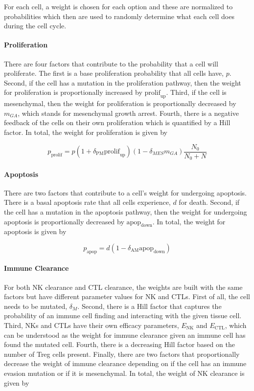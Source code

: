 \documentclass{article}
\begin{document}
For each cell, a weight is chosen for each option and these are normalized to probabilities which then are used to randomly determine what each cell does during the cell cycle.

\paragraph{Proliferation}
There are four factors that contribute to the probability that a cell will proliferate.
The first is a base proliferation probability that all cells have, $p$.
Second, if the cell has a mutation in the proliferation pathway, then the weight for proliferation is proportionally increased by $\text{prolif}_{\text{up}}$.
Third, if the cell is mesenchymal, then the weight for proliferation is proportionally decreased by $m_{GA}$, which stands for mesenchymal growth arrest.
Fourth, there is a negative feedback of the cells on their own proliferation which is quantified by a Hill factor.
In total, the weight for proliferation is given by

$$ p_{\text{prolif}} = p(1+\delta_{\text{PM}}\text{prolif}_{\text{up}})(1-\delta_{MES}m_{GA})\frac{N_0}{N_0+N} $$

\paragraph{Apoptosis}
There are two factors that contribute to a cell's weight for undergoing apoptosis.
There is a basal apoptosis rate that all cells experience, $d$ for death.
Second, if the cell has a mutation in the apoptosis pathway, then the weight for undergoing apoptosis is proportionally decreased by $\text{apop}_{\text{down}}$.
In total, the weight for apoptosis is given by 

$$ p_{\text{apop}} = d(1-\delta_{\text{AM}}\text{apop}_{\text{down}}) $$

\paragraph{Immune Clearance}
For both NK clearance and CTL clearance, the weights are built with the same factors but have different parameter values for NK and CTLs.
First of all, the cell needs to be mutated, $\delta_M$.
Second, there is a Hill factor that captures the probability of an immune cell finding and interacting with the given tissue cell.
Third, NKs and CTLs have their own efficacy parameters, $E_{\text{NK}}$ and $E_{\text{CTL}}$, which can be understood as the weight for immune clearance given an immune cell has found the mutated cell.
Fourth, there is a decreasing Hill factor based on the number of Treg cells present.
Finally, there are two factors that proportionally decrease the weight of immune clearance depending on if the cell has an immune evasion mutation or if it is mesenchymal.
In total, the weight of NK clearance is given by
\end{document}
